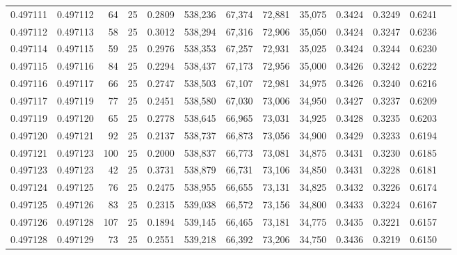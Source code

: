\begin{tabular}{rrrrrrrrrrrrr}
0.497111 & 0.497112 &    64 &  25 &                                     0.2809 & 538,236 &  67,374 &  72,881 &  35,075 & 0.3424 & 0.3249 & 0.6241 \\
0.497112 & 0.497113 &    58 &  25 &                                     0.3012 & 538,294 &  67,316 &  72,906 &  35,050 & 0.3424 & 0.3247 & 0.6236 \\
0.497114 & 0.497115 &    59 &  25 &                                     0.2976 & 538,353 &  67,257 &  72,931 &  35,025 & 0.3424 & 0.3244 & 0.6230 \\
0.497115 & 0.497116 &    84 &  25 &                                     0.2294 & 538,437 &  67,173 &  72,956 &  35,000 & 0.3426 & 0.3242 & 0.6222 \\
0.497116 & 0.497117 &    66 &  25 &                                     0.2747 & 538,503 &  67,107 &  72,981 &  34,975 & 0.3426 & 0.3240 & 0.6216 \\
0.497117 & 0.497119 &    77 &  25 &                                     0.2451 & 538,580 &  67,030 &  73,006 &  34,950 & 0.3427 & 0.3237 & 0.6209 \\
0.497119 & 0.497120 &    65 &  25 &                                     0.2778 & 538,645 &  66,965 &  73,031 &  34,925 & 0.3428 & 0.3235 & 0.6203 \\
0.497120 & 0.497121 &    92 &  25 &                                     0.2137 & 538,737 &  66,873 &  73,056 &  34,900 & 0.3429 & 0.3233 & 0.6194 \\
0.497121 & 0.497123 &   100 &  25 &                                     0.2000 & 538,837 &  66,773 &  73,081 &  34,875 & 0.3431 & 0.3230 & 0.6185 \\
0.497123 & 0.497123 &    42 &  25 &                                     0.3731 & 538,879 &  66,731 &  73,106 &  34,850 & 0.3431 & 0.3228 & 0.6181 \\
0.497124 & 0.497125 &    76 &  25 &                                     0.2475 & 538,955 &  66,655 &  73,131 &  34,825 & 0.3432 & 0.3226 & 0.6174 \\
0.497125 & 0.497126 &    83 &  25 &                                     0.2315 & 539,038 &  66,572 &  73,156 &  34,800 & 0.3433 & 0.3224 & 0.6167 \\
0.497126 & 0.497128 &   107 &  25 &                                     0.1894 & 539,145 &  66,465 &  73,181 &  34,775 & 0.3435 & 0.3221 & 0.6157 \\
0.497128 & 0.497129 &    73 &  25 &                                     0.2551 & 539,218 &  66,392 &  73,206 &  34,750 & 0.3436 & 0.3219 & 0.6150 \\

\end{tabular}
